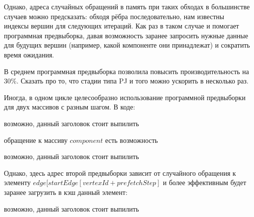 \documentclass[a4paper,10pt]{extarticle}
\begin{document}
Однако, адреса случайных обращений в память при таких обходах в большинстве случаев можно предсказать: обходя рёбра последовательно, нам известны индексы вершин для следующих итераций. Как раз в таком случае и помогает программная предвыборка, давая возможность заранее запросить нужные данные для будущих вершин (например, какой компоненте они принадлежат) и сократить время ожидания.


В среднем программная предвыборка позволила повысить производительность на 30\%. Сказать про то, что стадии типа PJ и того можно ускорить в несколько раз.

Иногда, в одном цикле целесообразно использование программной предвыборки для двух массивов с разным шагом. В коде:
\begin{algorithm}
    \SetAlgoLined
    \caption{возможно, данный заголовок стоит выпилить}
\end{algorithm}

обращение к массиву $component$ есть возможность 

\begin{algorithm}[H]
    \SetAlgoLined
    \caption{возможно, данный заголовок стоит выпилить}
\end{algorithm}

Однако, здесь адрес второй предвыборки зависит от случайного обращения к элементу $edge[startEdge[vertexId + prefetchStep]$ и более эффективным будет заранее загрузить в кэш данный элемент:
\begin{algorithm}
    \SetAlgoLined
    \caption{возможно, данный заголовок стоит выпилить}
\end{algorithm}
\end{document}
